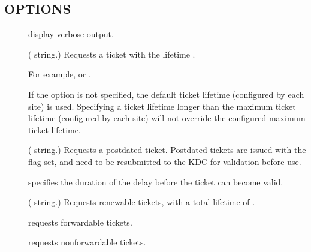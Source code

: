 \documentclass[letterpaper,10pt,english]{sphinxmanual}
\begin{document}
\subsection{OPTIONS}
\label{\detokenize{user/user_commands/kinit:options}}\begin{description}
\item[{}] \leavevmode
\sphinxAtStartPar
display verbose output.

\item[{ }] \leavevmode
\sphinxAtStartPar
( string.)  Requests a ticket with the lifetime
.

\sphinxAtStartPar
For example,  or .

\sphinxAtStartPar
If the  option is not specified, the default ticket lifetime
(configured by each site) is used.  Specifying a ticket lifetime
longer than the maximum ticket lifetime (configured by each site)
will not override the configured maximum ticket lifetime.

\item[{ }] \leavevmode
\sphinxAtStartPar
( string.)  Requests a postdated ticket.  Postdated
tickets are issued with the  flag set, and need to be
resubmitted to the KDC for validation before use.

\sphinxAtStartPar
{} specifies the duration of the delay before the ticket
can become valid.

\item[{ }] \leavevmode
\sphinxAtStartPar
( string.)  Requests renewable tickets, with a total
lifetime of .

\item[{}] \leavevmode
\sphinxAtStartPar
requests forwardable tickets.

\item[{}] \leavevmode
\sphinxAtStartPar
requests non\sphinxhyphen{}forwardable tickets.


\end{description}
\end{document}
